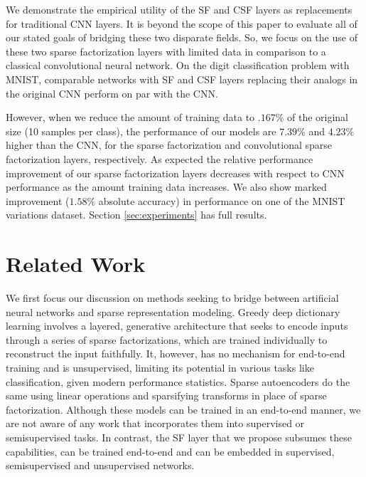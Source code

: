 \documentclass[10pt,twocolumn,letterpaper]{article}
\begin{document}
We demonstrate the empirical utility of the SF and CSF layers as replacements for traditional CNN layers.   
It is beyond the scope of this paper to evaluate all of our stated goals of bridging these two disparate fields.  So, we focus on the use of these two sparse factorization layers with limited data in comparison to a classical convolutional neural network.  On the digit classification problem with MNIST, comparable networks with SF and CSF layers replacing their analogs in the original CNN perform on par with the CNN.  

However, when we reduce the amount of training data to $.167\%$ of the original size (10 samples per class), the performance of our models are $7.39\%$ and $4.23\%$ higher than the CNN, for the sparse factorization and convolutional sparse factorization layers, respectively.  As expected the relative performance improvement of our sparse factorization layers decreases with respect to CNN performance as the amount training data increases.  We also show marked improvement ($1.58\%$ absolute accuracy) in performance on one of the MNIST variations dataset.  Section \ref{sec:experiments} has full results.




\section{Related Work}
\label{sec:related}

We first focus our discussion on methods seeking to bridge between artificial 
neural networks and sparse representation modeling.
Greedy deep dictionary learning \cite{TaMaSiarXiv2016} involves a layered, 
generative architecture that seeks to encode inputs through a series of sparse 
factorizations, which are trained individually to reconstruct the input 
faithfully.  It, however, has no mechanism for end-to-end training and is 
unsupervised, limiting its potential in various tasks like classification, 
given modern performance statistics.  Sparse autoencoders 
\cite{MaFrarXiv2013,HiMomentum2010} do the same using linear operations and 
sparsifying transforms in place of sparse factorization.  Although these models 
can be trained in an end-to-end manner, we are not aware of any work that 
incorporates them into supervised or semisupervised tasks.  In contrast, the SF 
layer that we propose subsumes these capabilities, can be trained end-to-end 
and can be embedded in supervised, semisupervised and unsupervised networks.
\end{document}
